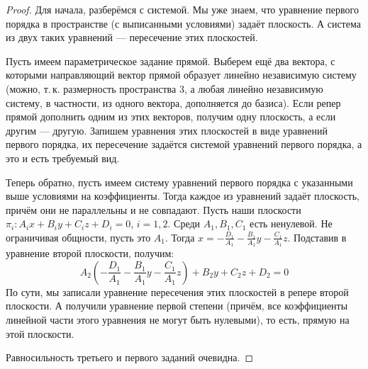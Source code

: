 \begin{proof}
    Для начала, разберёмся с системой. Мы уже знаем, что уравнение первого порядка в пространстве (с выписанными условиями) задаёт плоскость. А система из двух таких уравнений --- пересечение этих плоскостей.

    Пусть имеем параметрическое задание прямой. Выберем ещё два вектора, с которыми направляющий вектор прямой образует линейно независимую систему (можно, т.\,к. размерность пространства 3, а любая линейно независимую систему, в частности, из одного вектора, дополняется до базиса). Если репер прямой дополнить одним из этих векторов, получим одну плоскость, а если другим --- другую. Запишем уравнения этих плоскостей в виде уравнений первого порядка, их пересечение задаётся системой уравнений первого порядка, а это и есть требуемый вид.

    Теперь обратно, пусть имеем систему уравнений первого порядка с указанными выше условиями на коэффициенты. Тогда каждое из уравнений задаёт плоскость, причём они не параллельны и не совпадают. Пусть наши плоскости $\pi_i: A_ix + B_iy + C_iz + D_i = 0$, $i = 1, 2$. Среди $A_1, B_1, C_1$ есть ненулевой. Не ограничивая общности, пусть это $A_1$. Тогда $\displaystyle x = -\frac{D_1}{A_1} - \frac{B_1}{A_1}y - \frac{C_1}{A_1}z$. Подставив в уравнение второй плоскости, получим:
    $$
    A_2\left(-\frac{D_1}{A_1} - \frac{B_1}{A_1}y - \frac{C_1}{A_1}z\right) + B_2y + C_2z + D_2 = 0
    $$
    По сути, мы записали уравнение пересечения этих плоскостей в репере второй плоскости. А получили уравнение первой степени (причём, все коэффициенты линейной части этого уравнения не могут быть нулевыми), то есть, прямую на этой плоскости.

    Равносильность третьего и первого заданий очевидна.
\end{proof}


